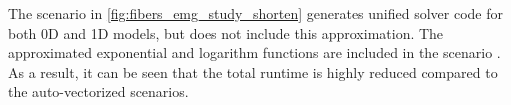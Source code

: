The scenario  in \cref{fig:fibers_emg_study_shorten} generates unified solver code for both 0D and 1D models, but does not include this approximation. The approximated exponential and logarithm functions are included in the scenario . As a result, it can be seen that the total runtime is highly reduced compared to the auto-vectorized scenarios.








